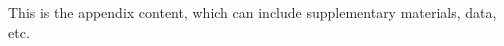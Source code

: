 \begin{appendix}
This is the appendix content, which can include supplementary materials, data, etc.
\end{appendix}